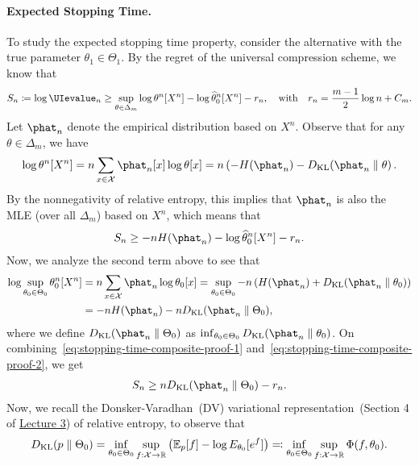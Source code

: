\documentclass[12pt]{article}
\begin{document}
\paragraph{Expected Stopping Time.} To study the expected stopping time property, consider the alternative with the true parameter $\theta_1 \in \Theta_1$. By the regret of the universal compression scheme, we know that 
\begin{align}
    S_n \coloneqq \log \UIevalue_n \geq  \sup_{\theta \in \Delta_m} \log \theta^n[X^n] - \log {\thetahat^n_0[X^n]} - r_n, \qtext{with} r_n = \frac{m-1}{2}\log n + C_m. 
\end{align}
Let $\phat_n$ denote the empirical distribution based on $X^n$. Observe that for any $\theta \in \Delta_m$, we have 
\begin{align}
    \log \theta^n[X^n] = n \sum_{x \in \calX} \phat_n[x] \log \theta[x] = n \lp - H(\phat_n) - \dkl(\phat_n \parallel \theta \rp. 
\end{align}
By the nonnegativity of relative entropy, this implies that $\phat_n$ is also the MLE (over all $\Delta_m$) based on $X^n$, which means that 
\begin{align}
    S_n \geq - nH(\phat_n) - \log \thetahat^n_0[X^n] - r_n. \label{eq:stopping-time-composite-proof-1}
\end{align}
Now, we analyze the second term above to see that 
\begin{align}
    \log \sup_{\theta_0 \in \Theta_0} \theta_0^n[X^n] &= n \sum_{x \in \calX} \phat_n \log \theta_0[x]  = \sup_{\theta_0 \in \Theta_0} -n  \lp H(\phat_n) + \dkl(\phat_n \parallel \theta_0) \rp \\
    & = -n H(\phat_n) -n \dkl(\phat_n \parallel \Theta_0), \label{eq:stopping-time-composite-proof-2}
\end{align}
where we define $\dkl(\phat_n \parallel \Theta_0)$ as $\inf_{\theta_0 \in \Theta_0} \dkl(\phat_n \parallel \theta_0)$. On combining~\eqref{eq:stopping-time-composite-proof-1} and~\eqref{eq:stopping-time-composite-proof-2}, we get 
\begin{align}
    S_n \geq n \dkl(\phat_n \parallel \Theta_0) - r_n. \label{eq:stopping-time-composite-proof-3}
\end{align}
Now, we recall the Donsker-Varadhan~(DV) variational representation~(Section 4 of \href{https://github.com/sshekhar17/ECE598/blob/main/Lec3/Lec3.pdf}{Lecture 3})  of relative entropy, to observe that 
\begin{align}
D_{\text{KL}}(p \parallel \Theta_0) = \inf_{\theta_0 \in \Theta_0} \sup_{f:{\cal X} \to \mathbb{R}} \left( \mathbb{E}_p[f] - \log E_{\theta_0}[e^f] \right) \eqcolon  \inf_{\theta_0 \in \Theta_0} \sup_{f:{\cal X} \to \mathbb{R}} \Phi(f, \theta_0).
\end{align}
\end{document}
